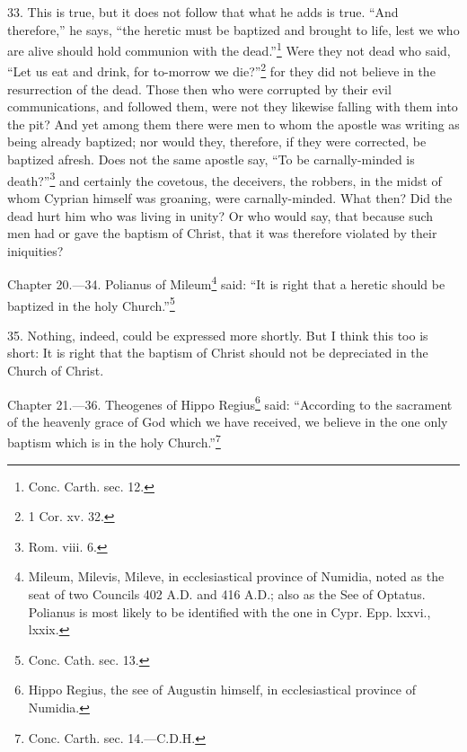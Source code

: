 33. This is true, but it does not follow that what he adds is true. ``And therefore,'' he says, ``the heretic must be baptized and brought to life, lest we who are alive should hold communion with the dead.''\footnote{\par  Conc. Carth. sec. 12.} Were they not dead who said, ``Let us eat and drink, for to-morrow we die?''\footnote{\par  1 Cor. xv. 32.} for they did not believe in the resurrection of the dead. Those then who were corrupted by their evil communications, and followed them, were not they likewise falling with them into the pit? And yet among them there were men to whom the apostle was writing as being already baptized; nor would they, therefore, if they were corrected, be baptized afresh. Does not the same apostle say, ``To be carnally-minded is death?''\footnote{\par  Rom. viii. 6.} and certainly the covetous, the deceivers, the robbers, in the midst of whom Cyprian himself was groaning, were carnally-minded. What then? Did the dead hurt him who was living in unity? Or who would say, that because such men had or gave the baptism of Christ, that it was therefore violated by their iniquities?


Chapter 20.—34. Polianus of Mileum\footnote{\par  Mileum, Milevis, Mileve, in ecclesiastical province of Numidia, noted as the seat of two Councils 402 A.D. and 416 A.D.; also as the See of Optatus. Polianus is most likely to be identified with the one in Cypr. Epp. lxxvi., lxxix.} said: ``It is right that a heretic should be baptized in the holy Church.''\footnote{\par  Conc. Cath. sec. 13.}

35. Nothing, indeed, could be expressed more shortly. But I think this too is short: It is right that the baptism of Christ should not be depreciated in the Church of Christ.


Chapter 21.—36. Theogenes of Hippo Regius\footnote{\par  Hippo Regius, the see of Augustin himself, in ecclesiastical province of Numidia.} said: ``According to the sacrament of the heavenly grace of God which we have received, we believe in the one only baptism which is in the holy Church.''\footnote{\par  Conc. Carth. sec. 14.—C.D.H.}

